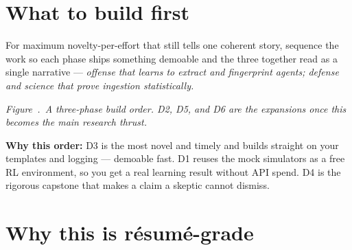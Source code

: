 \documentclass[11pt]{article}
\newcounter{fig}
\newcommand{\figcap}[1]{\par\vspace{4pt}\begin{center}%
  {\small\itshape\color{ink!70}\stepcounter{fig}Figure~\thefig.~#1}\end{center}}
\begin{document}
\section*{What to build first}

For maximum novelty-per-effort that still tells one coherent story, sequence the work so each phase
ships something demoable and the three together read as a single narrative ---
\emph{offense that learns to extract and fingerprint agents; defense and science that prove
ingestion statistically.}

\begin{center}
\end{center}
\figcap{A three-phase build order. D2, D5, and D6 are the expansions once this becomes the main
research thrust.}

\noindent\textbf{Why this order:} D3 is the most novel and timely and builds straight on your
templates and logging --- demoable fast. D1 reuses the mock simulators as a free RL environment, so
you get a real learning result without API spend. D4 is the rigorous capstone that makes a claim a
skeptic cannot dismiss.

\section*{Why this is r\'esum\'e-grade}
\end{document}
